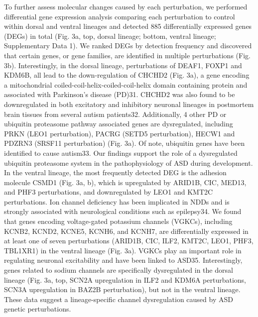 To further assess molecular changes caused by each perturbation, we performed differential gene expression analysis comparing each perturbation to control within dorsal and ventral lineages and detected 885 differentially expressed genes (DEGs) in total (Fig. 3a, top, dorsal lineage; bottom, ventral lineage; Supplementary Data 1). We ranked DEGs by detection frequency and discovered that certain genes, or gene families, are identified in multiple perturbations (Fig. 3b). Interestingly, in the dorsal lineage, perturbations of DEAF1, FOXP1 and KDM6B, all lead to the down-regulation of CHCHD2 (Fig. 3a), a gene encoding a mitochondrial coiled-coil-helix-coiled-coil-helix domain containing protein and associated with Parkinson’s disease (PD)31. CHCHD2 was also found to be downregulated in both excitatory and inhibitory neuronal lineages in postmortem brain tissues from several autism patients32. Additionally, 4 other PD or ubiquitin proteasome pathway associated genes are dysregulated, including PRKN (LEO1 perturbation), PACRG (SETD5 perturbation), HECW1 and PDZRN3 (SRSF11 perturbation) (Fig. 3a). Of note, ubiquitin genes have been identified to cause autism33. Our findings support the role of a dysregulated ubiquitin proteasome system in the pathophysiology of ASD during development. In the ventral lineage, the most frequently detected DEG is the adhesion molecule CSMD1 (Fig. 3a, b), which is upregulated by ARID1B, CIC, MED13, and PHF3 perturbations, and downregulated by LEO1 and KMT2C perturbations.
Ion channel deficiency has been implicated in NDDs and is strongly associated with neurological conditions such as epilepsy34. We found that genes encoding voltage-gated potassium channels (VGKCs), including KCNB2, KCND2, KCNE5, KCNH6, and KCNH7, are differentially expressed in at least one of seven perturbations (ARID1B, CIC, ILF2, KMT2C, LEO1, PHF3, TBL1XR1) in the ventral lineage (Fig. 3a). VGKCs play an important role in regulating neuronal excitability and have been linked to ASD35. Interestingly, genes related to sodium channels are specifically dysregulated in the dorsal lineage (Fig. 3a, top, SCN2A upregulation in ILF2 and KDM6A perturbations, SCN3A upregulation in BAZ2B perturbation), but not in the ventral lineage. These data suggest a lineage-specific channel dysregulation caused by ASD genetic perturbations. 


